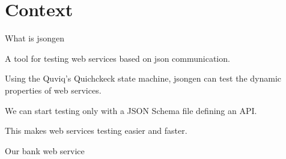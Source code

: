\section{Context}

\begin{frame}{What is jsongen}

  A tool for testing web services based on json communication.

  Using the Quviq's Quichckeck state machine, jsongen can test the
  dynamic properties of web services.

  We can start testing only with a JSON Schema file defining an API.

  This makes web services testing easier and faster.

\end{frame}

\begin{frame}{Our bank web service}
  \begin{figure}
    \centering
    \begin{overprint}[\textwidth]
  \end{overprint}
  \end{figure}
\end{frame}